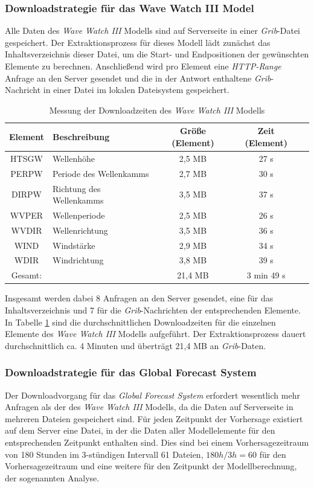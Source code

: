 \subsubsection{Downloadstrategie für das Wave Watch III Model}
Alle Daten des \textit{Wave Watch III} Modells sind auf Serverseite in
einer \textit{Grib}-Datei gespeichert. Der Extraktionsprozess für
dieses Modell lädt zunächst das Inhaltsverzeichnis dieser Datei, um
die Start- und Endpositionen der gewünschten Elemente zu
berechnen. Anschließend wird pro Element eine \textit{HTTP-Range}
Anfrage an den Server gesendet und die in der Antwort enthaltene
\textit{Grib}-Nachricht in einer Datei im lokalen Dateisystem
gespeichert.

\begin{table}[h]
  \centering
  {\sf
    \footnotesize
    \begin{longtable}{@{}clccc}
      \toprule
      \textbf{Element} & \textbf{Beschreibung} & \textbf{Größe (Element)} & \textbf{Zeit (Element)}  \\
      \midrule
      HTSGW & Wellenhöhe & 2,5 MB & 27 s \\
      PERPW & Periode des Wellenkamms & 2,7 MB & 30 s \\
      DIRPW & Richtung des Wellenkamms & 3,5 MB & 37 s \\
      WVPER & Wellenperiode & 2,5 MB & 26 s \\
      WVDIR & Wellenrichtung & 3,5 MB & 36 s \\
      WIND  & Windstärke & 2,9 MB & 34 s \\
      WDIR  & Windrichtung & 3,8 MB & 39 s \\
      \midrule
      Gesamt: & & 21,4 MB & 3 min 49 s \\
      \bottomrule
    \end{longtable}
  }
  \caption{Messung der Downloadzeiten des \textit{Wave Watch III} Modells}
  \label{tab:download_messung_ww3}
\end{table}

Insgesamt werden dabei 8 Anfragen an den Server gesendet, eine für das
Inhaltsverzeichnis und 7 für die \textit{Grib}-Nachrichten der
entsprechenden Elemente. In Tabelle \ref{tab:download_messung_ww3}
sind die durchschnittlichen Downloadzeiten für die einzelnen Elemente
des \textit{Wave Watch III} Modells aufgeführt. Der Extraktionsprozess
dauert durchschnittlich ca. 4 Minuten und überträgt 21,4 MB an
\textit{Grib}-Daten.

\subsubsection{Downloadstrategie für das Global Forecast System}
Der Downloadvorgang für das \textit{Global Forecast System} erfordert
wesentlich mehr Anfragen als der des \textit{Wave Watch III} Modells,
da die Daten auf Serverseite in mehreren Dateien gespeichert sind. Für
jeden Zeitpunkt der Vorhersage existiert auf dem Server eine Datei, in
der die Daten aller Modellelemente für den entsprechenden Zeitpunkt
enthalten sind. Dies sind bei einem Vorhersagezeitraum von 180 Stunden
im 3-stündigen Intervall 61 Dateien, $180h / 3h = 60$ für den
Vorhersagezeitraum und eine weitere für den Zeitpunkt der
Modellberechnung, der sogenannten Analyse.

